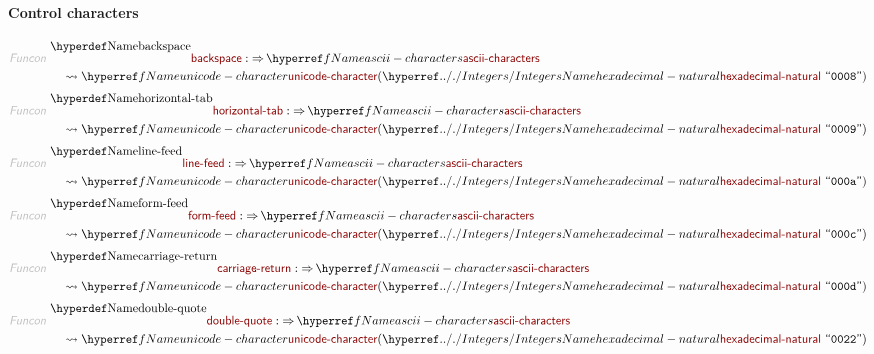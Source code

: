 \paragraph*{Control characters}\hypertarget{control-characters}{}\label{control-characters}

\begin{align*}
  \KEY{Funcon} ~ 
  & \NAMEDECL{backspace} :  \TO \NAMEREF{ascii-characters} \\
  & \quad \leadsto \NAMEREF{unicode-character}
                     ( \NAMEHYPER{../.}{Integers}{hexadecimal-natural} ~
                         \STRING{0008} )
\end{align*}
\begin{align*}
  \KEY{Funcon} ~ 
  & \NAMEDECL{horizontal-tab} :  \TO \NAMEREF{ascii-characters} \\
  & \quad \leadsto \NAMEREF{unicode-character}
                     ( \NAMEHYPER{../.}{Integers}{hexadecimal-natural} ~
                         \STRING{0009} )
\end{align*}
\begin{align*}
  \KEY{Funcon} ~ 
  & \NAMEDECL{line-feed} :  \TO \NAMEREF{ascii-characters} \\
  & \quad \leadsto \NAMEREF{unicode-character}
                     ( \NAMEHYPER{../.}{Integers}{hexadecimal-natural} ~
                         \STRING{000a} )
\end{align*}
\begin{align*}
  \KEY{Funcon} ~ 
  & \NAMEDECL{form-feed} :  \TO \NAMEREF{ascii-characters} \\
  & \quad \leadsto \NAMEREF{unicode-character}
                     ( \NAMEHYPER{../.}{Integers}{hexadecimal-natural} ~
                         \STRING{000c} )
\end{align*}
\begin{align*}
  \KEY{Funcon} ~ 
  & \NAMEDECL{carriage-return} :  \TO \NAMEREF{ascii-characters} \\
  & \quad \leadsto \NAMEREF{unicode-character}
                     ( \NAMEHYPER{../.}{Integers}{hexadecimal-natural} ~
                         \STRING{000d} )
\end{align*}
\begin{align*}
  \KEY{Funcon} ~ 
  & \NAMEDECL{double-quote} :  \TO \NAMEREF{ascii-characters} \\
  & \quad \leadsto \NAMEREF{unicode-character}
                     ( \NAMEHYPER{../.}{Integers}{hexadecimal-natural} ~
                         \STRING{0022} )
\end{align*}

